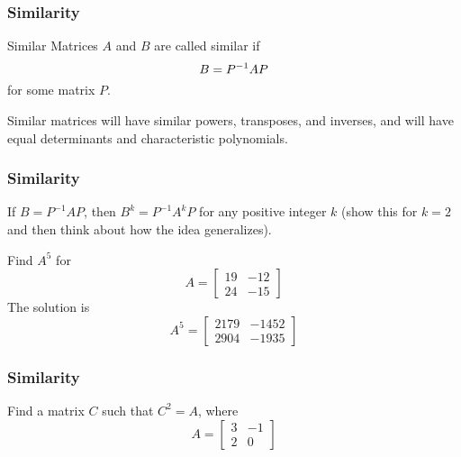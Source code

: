 \documentclass[xcolor=dvipsnames]{beamer}
\begin{document}
\begin{frame}
  \frametitle{Similarity}
  \begin{block}{Similar Matrices}
    $A$ and $B$ are called \alert{similar} if
    \begin{equation}
      \label{eq:aemiezef}
      B=P^{-1}AP\notag
    \end{equation}
    for some matrix $P$. 
  \end{block}

  \bigskip
  
Similar matrices will have similar powers, transposes, and inverses,
and will have equal determinants and characteristic polynomials.
\end{frame}

\begin{frame}
  \frametitle{Similarity}
  If $B=P^{-1}AP$, then $B^{k}=P^{-1}A^{k}P$ for any positive integer
  $k$ (show this for $k=2$ and then think about how the idea
  generalizes).

  \bigskip

  {\ubung} Find $A^{5}$ for
  \begin{equation}
    \label{eq:aisejiez}
    A=\left[
      \begin{array}{cc}
        19&-12 \\
        24&-15
      \end{array}\right]
  \end{equation}
  The solution is
  \begin{equation}
    \label{eq:pheishae}
    A^{5}=\left[
      \begin{array}{cc}
        2179&-1452 \\
        2904&-1935
      \end{array}\right]
  \end{equation}
\end{frame}

\begin{frame}
  \frametitle{Similarity}
  {\ubung} Find a matrix $C$ such that $C^{2}=A$, where
  \begin{equation}
    \label{eq:phaithee}
    A=\left[
      \begin{array}{cc}
        3&-1 \\
        2&0
      \end{array}\right]
  \end{equation}
\end{frame}
\end{document}
